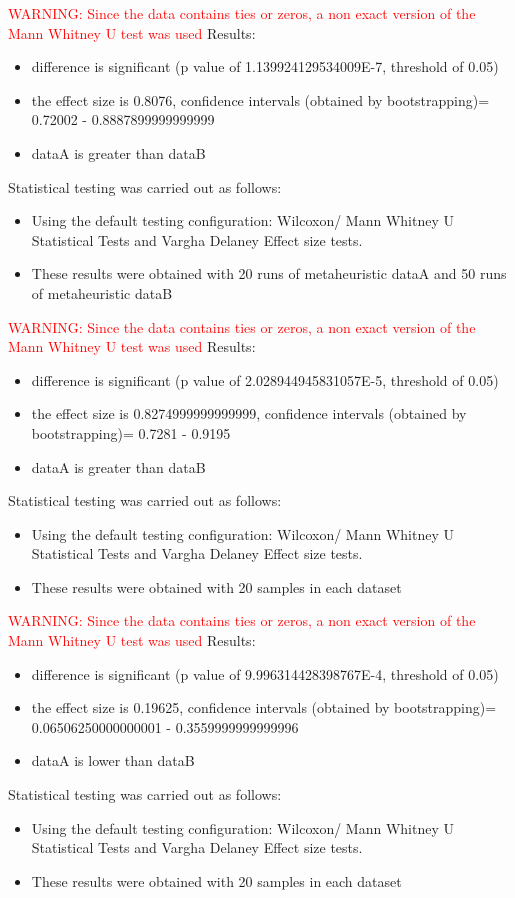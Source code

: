 \documentclass[]{article}
\begin{document}
\textcolor{Red}{WARNING: Since the data contains ties or zeros, a non exact version of the Mann Whitney U test was used
}
Results:
\begin{itemize}
\item{difference is significant (p value of 1.139924129534009E-7, threshold of 0.05)}
\item{the effect size is 0.8076, confidence intervals (obtained by bootstrapping)= 0.72002 - 0.8887899999999999}
\item{dataA is greater than dataB}
\end{itemize}Statistical testing was carried out as follows: \begin{itemize}
\item{Using the default testing configuration: Wilcoxon/ Mann Whitney U Statistical Tests and Vargha Delaney Effect size tests.}
\item{These results were obtained with 20 runs of metaheuristic dataA and 50 runs of metaheuristic dataB}
\end{itemize}
\textcolor{Red}{WARNING: Since the data contains ties or zeros, a non exact version of the Mann Whitney U test was used
}
Results:
\begin{itemize}
\item{difference is significant (p value of 2.028944945831057E-5, threshold of 0.05)}
\item{the effect size is 0.8274999999999999, confidence intervals (obtained by bootstrapping)= 0.7281 - 0.9195}
\item{dataA is greater than dataB}
\end{itemize}Statistical testing was carried out as follows: \begin{itemize}
\item{Using the default testing configuration: Wilcoxon/ Mann Whitney U Statistical Tests and Vargha Delaney Effect size tests.}
\item{These results were obtained with 20 samples in each dataset}
\end{itemize}
\textcolor{Red}{WARNING: Since the data contains ties or zeros, a non exact version of the Mann Whitney U test was used
}
Results:
\begin{itemize}
\item{difference is significant (p value of 9.996314428398767E-4, threshold of 0.05)}
\item{the effect size is 0.19625, confidence intervals (obtained by bootstrapping)= 0.06506250000000001 - 0.3559999999999996}
\item{dataA is lower than dataB}
\end{itemize}Statistical testing was carried out as follows: \begin{itemize}
\item{Using the default testing configuration: Wilcoxon/ Mann Whitney U Statistical Tests and Vargha Delaney Effect size tests.}
\item{These results were obtained with 20 samples in each dataset}
\end{itemize}
\end{document}
